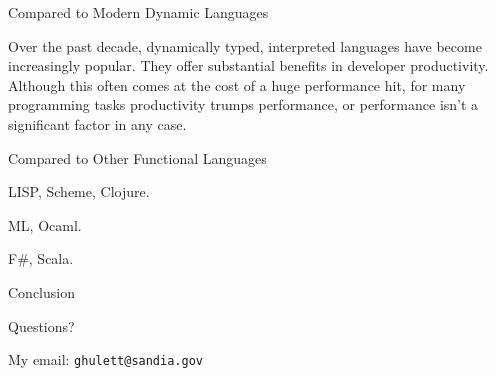 %
\begin{frame}{Compared to Modern Dynamic Languages}

Over the past decade, dynamically typed, interpreted languages have become
increasingly popular. They offer substantial benefits in developer productivity.
Although this often comes at the cost of a huge performance hit, for many
programming tasks productivity trumps performance, or performance isn’t a
significant factor in any case.

% 
% 
% 
% 

\end{frame}

%
\begin{frame}{Compared to Other Functional Languages}

LISP, Scheme, Clojure.

ML, Ocaml.

F\#, Scala.

\end{frame}


%
\begin{frame}{Conclusion}

Questions?

My email: \texttt{ghulett@sandia.gov}

\end{frame}
